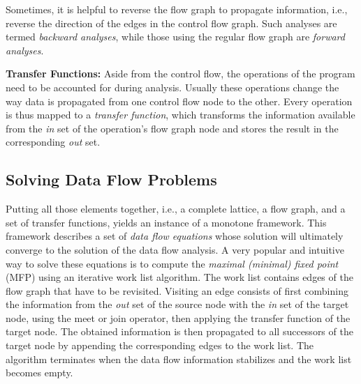 Sometimes, it is helpful to reverse the flow graph to propagate information,
i.e., reverse the direction of the edges in the control flow graph. Such
analyses are termed \emph{backward analyses}, while those using the
regular flow graph are \emph{forward analyses}.

\textbf{Transfer Functions:}
Aside from the control flow, the operations of the program
need to be accounted for during analysis.
Usually these operations change the way data is propagated from one control
flow node to the other. Every operation is thus mapped
to a \emph{transfer function}, which transforms the information available from
the \emph{in} set of the operation's flow graph node and stores the result in
the corresponding \emph{out} set.

\subsection{Solving Data Flow Problems}

Putting all those elements together, i.e., a complete lattice, a flow graph, and
a set of transfer functions, yields an instance of a monotone framework.
This framework describes a set of \emph{data flow equations} whose solution will
ultimately converge to the solution of the data flow analysis. A very popular and
intuitive way to solve these equations is to compute the \emph{maximal (minimal) fixed point}
(MFP) using
an iterative work list algorithm. The work list contains edges of the flow graph
that have to be revisited.
Visiting an edge consists of first combining the information from the \emph{out}
set of the source node with the \emph{in} set of the target node,
using the meet or join operator, then applying the transfer function of the
target node. The obtained information is then propagated to all successors
of the target node by appending the corresponding edges to the work list.
The algorithm terminates when the data flow information stabilizes and the work
list becomes empty.

